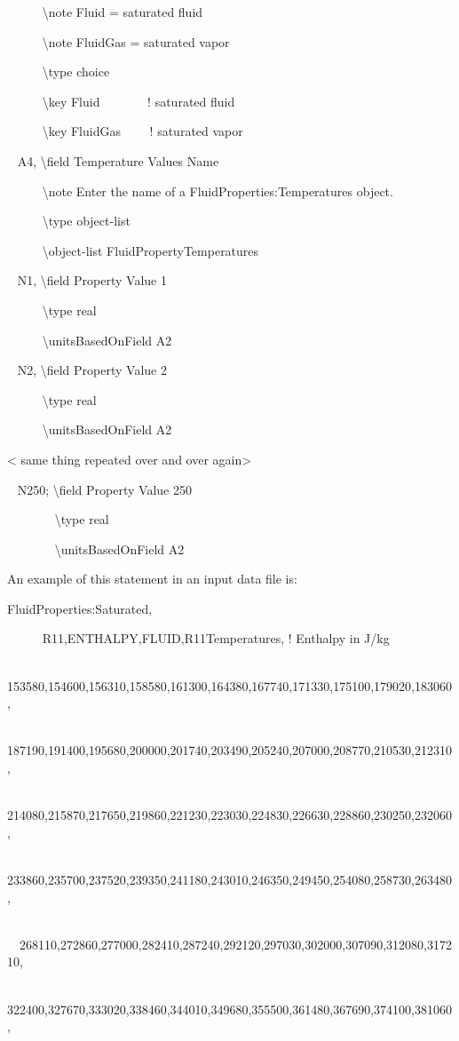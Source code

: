 ~~~~~ \textbackslash{}note Fluid = saturated fluid

~~~~~ \textbackslash{}note FluidGas = saturated vapor

~~~~~ \textbackslash{}type choice

~~~~~ \textbackslash{}key Fluid ~~~~~~~! saturated fluid

~~~~~ \textbackslash{}key FluidGas~~~~ ! saturated vapor

~ A4, \textbackslash{}field Temperature Values Name

~~~~~ \textbackslash{}note Enter the name of a FluidProperties:Temperatures object.

~~~~~ \textbackslash{}type object-list

~~~~~ \textbackslash{}object-list FluidPropertyTemperatures

~ N1, \textbackslash{}field Property Value 1

~~~~~ \textbackslash{}type real

~~~~~ \textbackslash{}unitsBasedOnField A2

~ N2, \textbackslash{}field Property Value 2

~~~~~ \textbackslash{}type real

~~~~~ \textbackslash{}unitsBasedOnField A2

\textless{} same thing repeated over and over again\textgreater{}

~ N250; \textbackslash{}field Property Value 250

~~~~~~~ \textbackslash{}type real

~~~~~~~ \textbackslash{}unitsBasedOnField A2

An example of this statement in an input data file is:

FluidProperties:Saturated,

~~~~~ R11,ENTHALPY,FLUID,R11Temperatures, ! Enthalpy in J/kg

~~~~~ 153580,154600,156310,158580,161300,164380,167740,171330,175100,179020,183060,

~~~~~ 187190,191400,195680,200000,201740,203490,205240,207000,208770,210530,212310,

~~~~~ 214080,215870,217650,219860,221230,223030,224830,226630,228860,230250,232060,

~~~~~ 233860,235700,237520,239350,241180,243010,246350,249450,254080,258730,263480,

~~~ ~~268110,272860,277000,282410,287240,292120,297030,302000,307090,312080,317210,

~~~~~ 322400,327670,333020,338460,344010,349680,355500,361480,367690,374100,381060,

